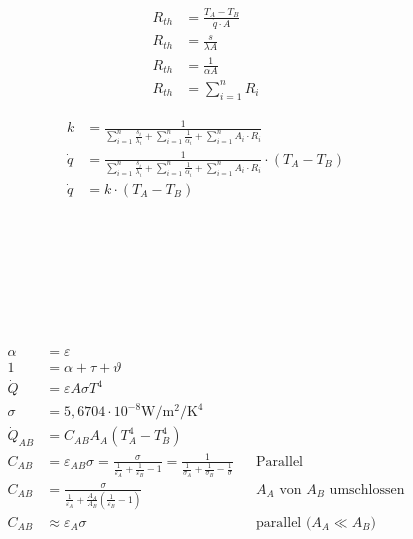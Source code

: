 \begin{boxleft}
\end{boxleft}\begin{boxrightshaded}
\begin{align*}
R_{th}&=\frac{T_A-T_B}{\dot{q}\cdot A}\\
R_{th}&=\frac{s}{\lambda A}\\
R_{th}&=\frac{1}{\alpha A}\\
R_{th}&=\sum_{i=1}^n R_{i}
\end{align*}
\end{boxrightshaded}

\begin{boxleft}
\end{boxleft}\begin{boxrightshaded}
\begin{align*}
k&=\frac{1}{\sum_{i=1}^n\frac{s_i}{\lambda_i}+\sum_{i=1}^n\frac{1}{\alpha_i}+\sum_{i=1}^n  A_{i}\cdot R_{i}}\\
\dot{q}&=\frac{1}{\sum_{i=1}^n\frac{s_i}{\lambda_i}+\sum_{i=1}^n\frac{1}{\alpha_i}+\sum_{i=1}^n A_{i}\cdot R_{i}}\cdot\left(T_A-T_B\right)\\
\dot{q}&=k\cdot\left(T_A-T_B\right)
\end{align*}
\end{boxrightshaded}

\begin{boxleft}
\\
\\
\\
\\
\\
\\
\end{boxleft}\begin{boxrightshaded}
\begin{align*}
\alpha&=\varepsilon\\
1&=\alpha+\tau+\vartheta\\
\dot{Q}&=\varepsilon A \sigma T^4\\
\sigma&=5,6704\cdot10^{-8}\si{\watt\per\metre\tothe{2}\per\kelvin\tothe{4}}\\
\dot{Q}_{AB}&=C_{AB}A_A\left(T_A^4-T_B^4\right)\\
C_{AB}&=\varepsilon_{AB}\sigma=\frac{\sigma}{\frac{1}{\varepsilon_A}+\frac{1}{\varepsilon_B}-1}=\frac{1}{\frac{1}{\sigma_A}+\frac{1}{\sigma_B}-\frac{1}{\sigma}}&&\text{Parallel}\\
C_{AB}&=\frac{\sigma}{\frac{1}{\varepsilon_A}+\frac{A_A}{A_B}\left(\frac{1}{\varepsilon_B}-1\right)}&&\text{$A_A$ von $A_B$ umschlossen}\\
C_{AB}&\approx\varepsilon_A\sigma&&\text{parallel ($A_A\ll A_B$)}
\end{align*}
\end{boxrightshaded}


